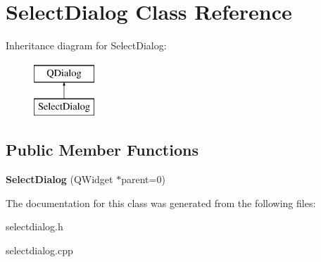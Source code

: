 \hypertarget{class_select_dialog}{}\section{Select\+Dialog Class Reference}
\label{class_select_dialog}
Inheritance diagram for Select\+Dialog\+:\begin{figure}[H]
\begin{center}
\leavevmode
\includegraphics[height=2.000000cm]{class_select_dialog}
\end{center}
\end{figure}
\subsection*{Public Member Functions}
\begin{DoxyCompactItemize}
\item 
\mbox{\label{class_select_dialog_a5c77144fb8eadc97861eaa6643f7941a}} 
{\bfseries Select\+Dialog} (Q\+Widget $\ast$parent=0)
\end{DoxyCompactItemize}


The documentation for this class was generated from the following files\+:\begin{DoxyCompactItemize}
\item 
selectdialog.\+h\item 
selectdialog.\+cpp\end{DoxyCompactItemize}
